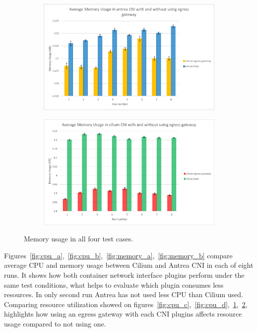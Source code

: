 \begin{figure}[H]
    \begin{subfigure}[b]{0.35\textwidth}
        \includegraphics[width=\textwidth]{plots/small/memory_antrea.png}
        \caption{}
        \label{fig:memory_c}
    \end{subfigure}
    \hfill
    \begin{subfigure}[b]{0.35\textwidth}
        \includegraphics[width=\textwidth]{plots/small/memory_cilium.png}
        \caption{}
        \label{fig:memory_d}
    \end{subfigure}
    
    \caption{Memory usage in all four test cases.}
    \label{fig:memoryFour}
\end{figure}

Figures~\ref{fig:cpu_a},~\ref{fig:cpu_b},~\ref{fig:memory_a},~\ref{fig:memory_b} compare average CPU and memory usage between Cilium and Antrea CNI in each of eight runs. It shows how both container network interface plugins perform under the same test conditions, what helps to evaluate which plugin consumes less resources. In only second run Antrea has not used less CPU than Cilium used.
Comparing resource utilization showed on figures~\ref{fig:cpu_c},~\ref{fig:cpu_d},~\ref{fig:memory_c},~\ref{fig:memory_d}, highlights how using an egress gateway with each CNI plugins affects resource usage compared to not using one.

